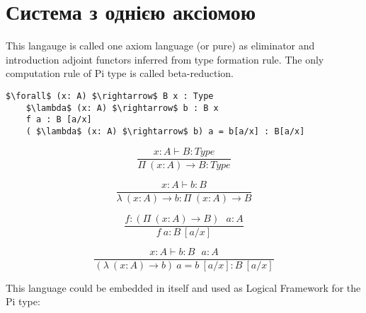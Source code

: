 \section{Система з однією аксіомою}

This langauge is called one axiom language (or pure) as eliminator
and introduction adjoint functors inferred from type formation rule.
The only computation rule of Pi type is called beta-reduction.

\begin{lstlisting}[mathescape=true]
    $\forall$ (x: A) $\rightarrow$ B x : Type
    $\lambda$ (x: A) $\rightarrow$ b : B x
    f a : B [a/x]
    ( $\lambda$ (x: A) $\rightarrow$ b) a = b[a/x] : B[a/x]

\end{lstlisting}


                        \begin{equation}
                        \tag{$\Pi$-formation}
                        \dfrac
                        {x:A \vdash B : Type}
                        {\Pi\ (x:A) \rightarrow B : Type}
                        \end{equation}

                        \begin{equation}
                        \tag{$\lambda$-intro}
                        \dfrac
                        {x:A \vdash b : B}
                        {\lambda\ (x:A) \rightarrow b : \Pi\ (x: A) \rightarrow B }
                        \end{equation}

                        \begin{equation}
                        \tag{$App$-elimination}
                        \dfrac
                        {f: (\Pi\ (x:A) \rightarrow B)\ \ \ a: A}
                        {f\ a : B\ [a/x]}
                        \end{equation}

                        \begin{equation}
                        \tag{$\beta$-computation}
                        \dfrac
                        {x:A \vdash b: B\ \ \ a:A}
                        {(\lambda\ (x:A) \rightarrow b)\ a = b\ [a/x] : B\ [a/x]}
                        \end{equation}

\vspace{0.5cm}
                    This language could be embedded in itself and used
                    as Logical Framework for the Pi type:

